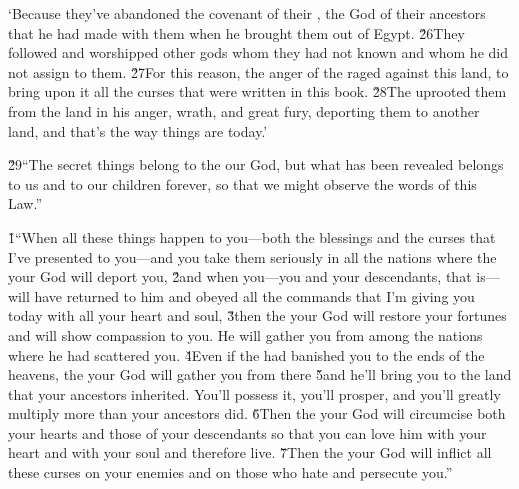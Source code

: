 \begin{poetry}
\poeml `Because they've abandoned the covenant of their , the God of their ancestors that he had made with them when he brought them out of Egypt. \v{26}They followed and worshipped other gods whom they had not known and whom he did not assign to them. \v{27}For this reason, the anger of the  raged against this land, to bring upon it all the curses that were written in this book. \v{28}The  uprooted them from the land in his anger, wrath, and great fury, deporting them to another land, and that's the way things are today.'
\end{poetry}

\v{29}``The secret things belong to the  our God, but what has been revealed belongs to us and to our children forever, so that we might observe the words of this Law.''

\v{1}``When all these things happen to you---both the blessings and the curses that I've presented to you---and you take them seriously in all the nations where the  your God will deport you, \v{2}and when you---you and your descendants, that is---will have returned to him and obeyed all the commands that I'm giving you today with all your heart and soul, \v{3}then the  your God will restore your fortunes and will show compassion to you. He will gather you from among the nations where he had scattered you. \v{4}Even if the  had banished you to the ends of the heavens, the  your God will gather you from there \v{5}and he'll bring you to the land that your ancestors inherited. You'll possess it, you'll prosper, and you'll greatly multiply more than your ancestors did. \v{6}Then the  your God will circumcise both your hearts and those of your descendants so that you can love him with your heart and with your soul and therefore live. \v{7}Then the  your God will inflict all these curses on your enemies and on those who hate and persecute you.''

